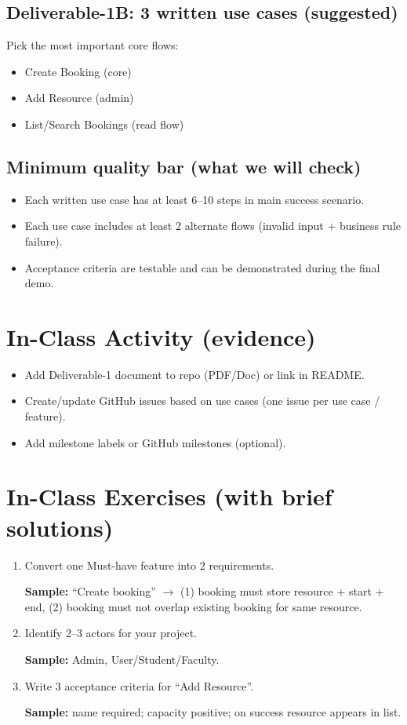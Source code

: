 \documentclass[11pt]{article}
\begin{document}
\subsection*{Deliverable-1B: 3 written use cases (suggested)}
Pick the most important core flows:
\begin{itemize}
  \item Create Booking (core)
  \item Add Resource (admin)
  \item List/Search Bookings (read flow)
\end{itemize}

\subsection*{Minimum quality bar (what we will check)}
\begin{itemize}
  \item Each written use case has at least 6--10 steps in main success scenario.
  \item Each use case includes at least 2 alternate flows (invalid input + business rule failure).
  \item Acceptance criteria are testable and can be demonstrated during the final demo.
\end{itemize}

\section{In-Class Activity (evidence)}
\begin{itemize}
  \item Add Deliverable-1 document to repo (PDF/Doc) or link in README.
  \item Create/update GitHub issues based on use cases (one issue per use case / feature).
  \item Add milestone labels or GitHub milestones (optional).
\end{itemize}

\section{In-Class Exercises (with brief solutions)}
\begin{enumerate}
  \item Convert one Must-have feature into 2 requirements.\par
  \textbf{Sample:} ``Create booking'' $\rightarrow$ (1) booking must store resource + start + end, (2) booking must not overlap existing booking for same resource.

  \item Identify 2--3 actors for your project.\par
  \textbf{Sample:} Admin, User/Student/Faculty.

  \item Write 3 acceptance criteria for ``Add Resource''.\par
  \textbf{Sample:} name required; capacity positive; on success resource appears in list.
\end{enumerate}
\end{document}
